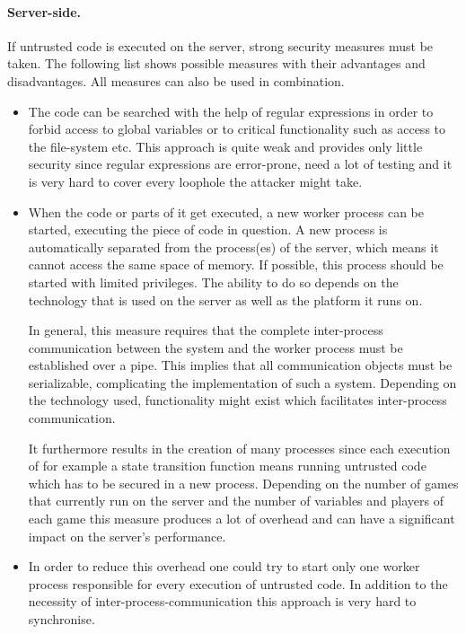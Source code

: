 \paragraph{Server-side.} If untrusted code is executed on the server, strong security measures must be taken. The following list shows possible measures with their advantages and disadvantages. All measures can also be used in combination.
\begin{itemize}
\item The code can be searched with the help of regular expressions in order to forbid access to global variables or to critical functionality such as access to the file-system etc. This approach is quite weak and provides only little security since regular expressions are error-prone, need a lot of testing and it is very hard to cover every loophole the attacker might take.
\item When the code or parts of it get executed, a new worker process can be started, executing the piece of code in question. A new process is automatically separated from the process(es) of the server, which means it cannot access the same space of memory. If possible, this process should be started with limited privileges. The ability to do so depends on the technology that is used on the server as well as the platform it runs on. 

In general, this measure requires that the complete inter-process communication between the system and the worker process must be established over a pipe. This implies that all communication objects must be serializable, complicating the implementation of such a system. Depending on the technology used, functionality might exist which facilitates inter-process communication. 

It furthermore results in the creation of many processes since each execution of for example a state transition function means running untrusted code which has to be secured in a new process. Depending on the number of games that currently run on the server and the number of variables and players of each game this measure produces a lot of overhead and can have a significant impact on the server's performance.
\item In order to reduce this overhead one could try to start only one worker process responsible for every execution of untrusted code. In addition to the necessity of inter-process-communication this approach is very hard to synchronise.
\end{itemize}

